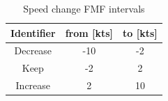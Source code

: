 \begin{table}[h!]
\begin{minipage}{.5\linewidth}
    \end{minipage}%
    \begin{minipage}{.5\linewidth}
        \caption*{Speed change  FMF intervals}
        \centering
        \begin{tabular}{ccc}
            \toprule
            Identifier                    & from [kts] & to [kts] \\
            \midrule
            \rowcolor{black!20} Decrease  & -10        & -2       \\
            Keep                          & -2         & 2        \\
            \rowcolor{black!20}  Increase & 2          & 10       \\

            \bottomrule
        \end{tabular}

    \end{minipage}%
\end{table}









